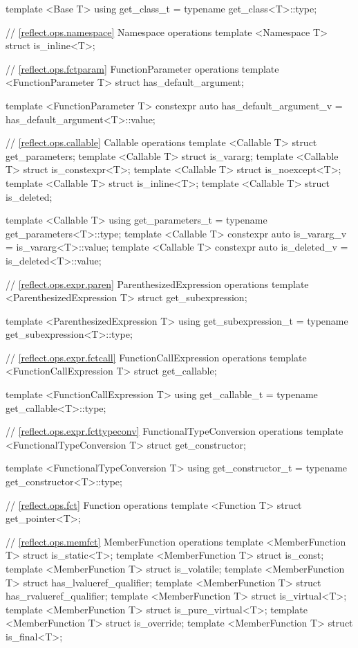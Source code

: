 \begin{std.txt}
\begin{codeblock}
{{template <Base T>
  using get_class_t = typename get_class<T>::type;

// \ref{reflect.ops.namespace} Namespace operations
template <Namespace T> struct is_inline<T>;

// \ref{reflect.ops.fctparam} FunctionParameter operations
template <FunctionParameter T> struct has_default_argument;

template <FunctionParameter T>
  constexpr auto has_default_argument_v = has_default_argument<T>::value;

// \ref{reflect.ops.callable} Callable operations
template <Callable T> struct get_parameters;
template <Callable T> struct is_vararg;
template <Callable T> struct is_constexpr<T>;
template <Callable T> struct is_noexcept<T>;
template <Callable T> struct is_inline<T>;
template <Callable T> struct is_deleted;

template <Callable T>
  using get_parameters_t = typename get_parameters<T>::type;
template <Callable T>
  constexpr auto is_vararg_v = is_vararg<T>::value;
template <Callable T>
  constexpr auto is_deleted_v = is_deleted<T>::value;

// \ref{reflect.ops.expr.paren} ParenthesizedExpression operations
template <ParenthesizedExpression T> struct get_subexpression;

template <ParenthesizedExpression T>
   using get_subexpression_t = typename get_subexpression<T>::type;

// \ref{reflect.ops.expr.fctcall} FunctionCallExpression operations
template <FunctionCallExpression T> struct get_callable;

template <FunctionCallExpression T>
  using get_callable_t = typename get_callable<T>::type;

// \ref{reflect.ops.expr.fcttypeconv} FunctionalTypeConversion operations
template <FunctionalTypeConversion T> struct get_constructor;

template <FunctionalTypeConversion T>
  using get_constructor_t = typename get_constructor<T>::type;

// \ref{reflect.ops.fct} Function operations
template <Function T> struct get_pointer<T>;

// \ref{reflect.ops.memfct} MemberFunction operations
template <MemberFunction T> struct is_static<T>;
template <MemberFunction T> struct is_const;
template <MemberFunction T> struct is_volatile;
template <MemberFunction T> struct has_lvalueref_qualifier;
template <MemberFunction T> struct has_rvalueref_qualifier;
template <MemberFunction T> struct is_virtual<T>;
template <MemberFunction T> struct is_pure_virtual<T>;
template <MemberFunction T> struct is_override;
template <MemberFunction T> struct is_final<T>;

}}
\end{codeblock}
\end{std.txt}

